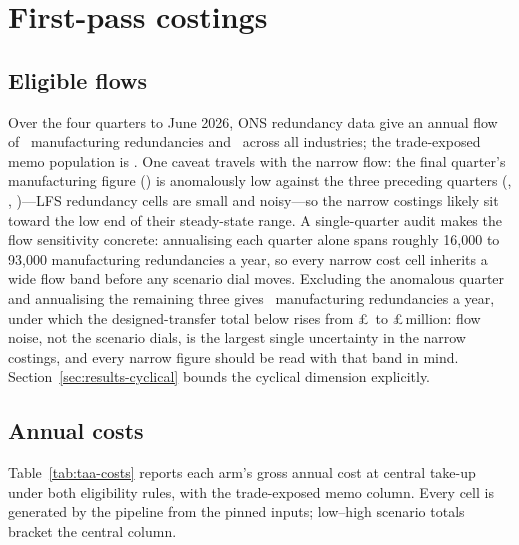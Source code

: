 \section{First-pass costings}\label{sec:results}

\subsection{Eligible flows}

Over the four quarters to June 2026, ONS redundancy data give an annual
flow of \TaaFlowManuf\ manufacturing redundancies and \TaaFlowAll\ across
all industries; the trade-exposed memo population is \TaaFlowExposed. One
caveat travels with the narrow flow: the final quarter's manufacturing
figure (\TaaRedManufAprJunTwentySix) is anomalously low against the three
preceding quarters (\TaaRedManufJulSepTwentyFive,
\TaaRedManufOctDecTwentyFive, \TaaRedManufJanMarTwentySix)---LFS
redundancy cells are small and noisy---so the narrow costings likely sit
toward the low end of their steady-state range. A single-quarter audit
makes the flow sensitivity concrete: annualising each quarter alone spans
roughly 16{,}000 to 93{,}000 manufacturing redundancies a year, so every
narrow cost cell inherits a wide flow band before any scenario dial
moves. Excluding the anomalous quarter and annualising the
remaining three gives \TaaFlowManufExAnom\ manufacturing redundancies a
year, under which the designed-transfer total below rises from
\pounds\TaaTotalABCCentralNarrow\ to
\pounds\TaaTotalABCCentralNarrowExAnom\,million: flow noise, not the
scenario dials, is the largest single uncertainty in the narrow
costings, and every narrow figure should be read with that band in mind.
Section~\ref{sec:results-cyclical} bounds the cyclical dimension
explicitly.

\subsection{Annual costs}

Table~\ref{tab:taa-costs} reports each arm's gross annual cost at central
take-up under both eligibility rules, with the trade-exposed memo
column. Every cell is generated by the pipeline from the pinned inputs;
low--high scenario totals bracket the central column.


